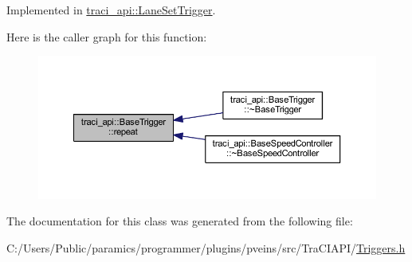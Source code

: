 Implemented in \hyperlink{classtraci__api_1_1_lane_set_trigger_ae606560cb760e12b0f1a86407f614e18}{traci\+\_\+api\+::\+Lane\+Set\+Trigger}.

Here is the caller graph for this function\+:
\nopagebreak
\begin{figure}[H]
\begin{center}
\leavevmode
\includegraphics[width=350pt]{classtraci__api_1_1_base_trigger_a7d2b1ac3f54e42e71eae69f1c7f33943_icgraph}
\end{center}
\end{figure}


The documentation for this class was generated from the following file\+:\begin{DoxyCompactItemize}
\item 
C\+:/\+Users/\+Public/paramics/programmer/plugins/pveins/src/\+Tra\+C\+I\+A\+P\+I/\hyperlink{_triggers_8h}{Triggers.\+h}\end{DoxyCompactItemize}
